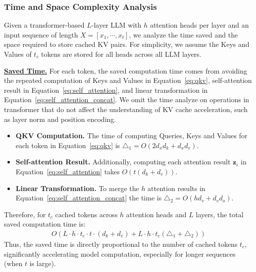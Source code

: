  
 

\subsubsection{Time and Space Complexity Analysis}\label{sssec:time_space}
Given a transformer-based $L$-layer LLM with $h$ attention heads per layer and an input sequence of length $X = [x_1, \cdots, x_t]$, we analyze the time saved and the space required to store cached KV pairs. For simplicity, we assume the Keys and Values of $t_c$ tokens are stored for all heads across all LLM layers.

\noindent \underline{\textbf{Saved Time.}} 
    For each token,
    the saved computation time comes from avoiding the repeated computation of Keys and Values in Equation~\eqref{eq:qkv}, self-attention result in Equation~\eqref{eq:self_attention}, 
    and linear transformation  in  Equation~\eqref{eq:self_attention_concat}.
     We omit the time analyze on operations in transformer that do not affect  the understanding of KV cache acceleration, such as layer norm and position encoding.

\begin{itemize}[leftmargin=10pt]
    \item \textbf{QKV Computation.} 
    The time of computing Queries, Keys and Values for each token in Equation~\eqref{eq:qkv} is $\triangle_1 = O(2d_xd_k + d_xd_v)$.
  
    \item  \textbf{Self-attention Result.} 
    Additionally, computing each attention result $\mathbf{z}_i$ in Equation~\eqref{eq:self_attention} takes $O(t(d_k + d_v))$.

   \item \textbf{Linear Transformation.}
    To merge the $h$ attention results in  Equation~\eqref{eq:self_attention_concat} 
    the time is $\triangle_2 = O(hd_v+d_vd_o)$. 

\end{itemize}
Therefore, for $t_c$ cached tokens across $h$ attention heads and $L$ layers, the total saved computation time is:
\begin{align}
    O\left(L\cdot h \cdot t_c \cdot t \cdot (d_k+d_v)+ L\cdot h \cdot t_c\left(\triangle_1 + \triangle_2\right)\right)
\end{align}
\noindent Thus, the saved time is directly proportional to the number of cached tokens $t_c$, 
significantly accelerating model computation, especially for longer sequences (when $t$ is large).



